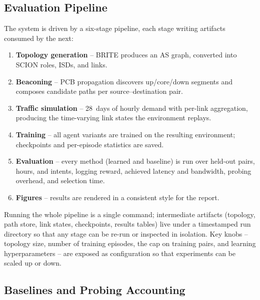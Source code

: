 \subsection{Evaluation Pipeline}
\label{sec:p1impl:pipeline}

The system is driven by a six-stage pipeline, each stage writing artifacts consumed by the next:

\begin{enumerate}
  \item \textbf{Topology generation} -- BRITE produces an AS graph, converted into SCION roles, ISDs, and
  links.
  \item \textbf{Beaconing} -- PCB propagation discovers up/core/down segments and composes candidate paths
  per source--destination pair.
  \item \textbf{Traffic simulation} -- 28~days of hourly demand with per-link aggregation, producing the
  time-varying link states the environment replays.
  \item \textbf{Training} -- all agent variants are trained on the resulting environment; checkpoints and
  per-episode statistics are saved.
  \item \textbf{Evaluation} -- every method (learned and baseline) is run over held-out pairs, hours, and
  intents, logging reward, achieved latency and bandwidth, probing overhead, and selection time.
  \item \textbf{Figures} -- results are rendered in a consistent style for the report.
\end{enumerate}

Running the whole pipeline is a single command; intermediate artifacts (topology, path store, link
states, checkpoints, results tables) live under a timestamped run directory so that any stage can be
re-run or inspected in isolation. Key knobs -- topology size, number of training episodes, the cap on
training pairs, and learning hyperparameters -- are exposed as configuration so that experiments can be
scaled up or down.

\subsection{Baselines and Probing Accounting}
\label{sec:p1impl:baselines}

